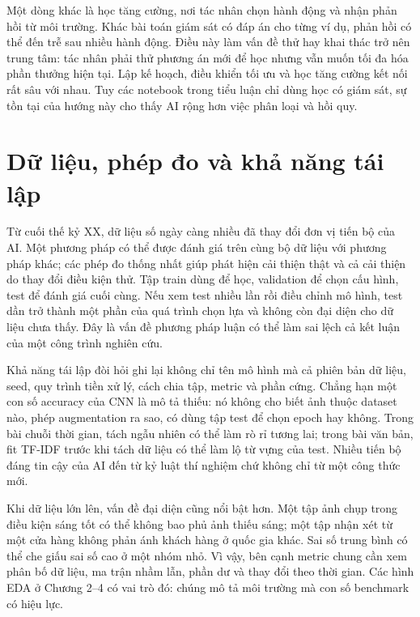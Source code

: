 \documentclass[12pt,a4paper]{report}
\begin{document}
Một dòng khác là học tăng cường, nơi tác nhân chọn hành động và nhận phản hồi từ môi trường. Khác bài toán giám sát có đáp án cho từng ví dụ, phản hồi có thể đến trễ sau nhiều hành động. Điều này làm vấn đề thử hay khai thác trở nên trung tâm: tác nhân phải thử phương án mới để học nhưng vẫn muốn tối đa hóa phần thưởng hiện tại. Lập kế hoạch, điều khiển tối ưu và học tăng cường kết nối rất sâu với nhau. Tuy các notebook trong tiểu luận chỉ dùng học có giám sát, sự tồn tại của hướng này cho thấy AI rộng hơn việc phân loại và hồi quy.

\section{Dữ liệu, phép đo và khả năng tái lập}
Từ cuối thế kỷ XX, dữ liệu số ngày càng nhiều đã thay đổi đơn vị tiến bộ của AI. Một phương pháp có thể được đánh giá trên cùng bộ dữ liệu với phương pháp khác; các phép đo thống nhất giúp phát hiện cải thiện thật và cả cải thiện do thay đổi điều kiện thử. Tập train dùng để học, validation để chọn cấu hình, test để đánh giá cuối cùng. Nếu xem test nhiều lần rồi điều chỉnh mô hình, test dần trở thành một phần của quá trình chọn lựa và không còn đại diện cho dữ liệu chưa thấy. Đây là vấn đề phương pháp luận có thể làm sai lệch cả kết luận của một công trình nghiên cứu.

Khả năng tái lập đòi hỏi ghi lại không chỉ tên mô hình mà cả phiên bản dữ liệu, seed, quy trình tiền xử lý, cách chia tập, metric và phần cứng. Chẳng hạn một con số accuracy của CNN là mô tả thiếu: nó không cho biết ảnh thuộc dataset nào, phép augmentation ra sao, có dùng tập test để chọn epoch hay không. Trong bài chuỗi thời gian, tách ngẫu nhiên có thể làm rò rỉ tương lai; trong bài văn bản, fit TF-IDF trước khi tách dữ liệu có thể làm lộ từ vựng của test. Nhiều tiến bộ đáng tin cậy của AI đến từ kỷ luật thí nghiệm chứ không chỉ từ một công thức mới.

Khi dữ liệu lớn lên, vấn đề đại diện cũng nổi bật hơn. Một tập ảnh chụp trong điều kiện sáng tốt có thể không bao phủ ảnh thiếu sáng; một tập nhận xét từ một cửa hàng không phản ánh khách hàng ở quốc gia khác. Sai số trung bình có thể che giấu sai số cao ở một nhóm nhỏ. Vì vậy, bên cạnh metric chung cần xem phân bố dữ liệu, ma trận nhầm lẫn, phần dư và thay đổi theo thời gian. Các hình EDA ở Chương 2--4 có vai trò đó: chúng mô tả môi trường mà con số benchmark có hiệu lực.
\end{document}

